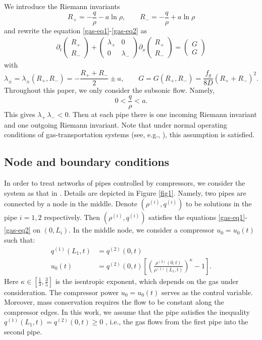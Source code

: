 \documentclass[12pt]{article}
\numberwithin{equation}{section}
\begin{document}
We introduce the Riemann invariants
$$
R_+=-\frac{q}{\rho}-a\ln \rho,\qquad 
R_-=-\frac{q}{\rho}+a\ln \rho
$$
and rewrite the equation \eqref{gas-eq1}-\eqref{gas-eq2} as
\begin{align}\label{gas-RI-eq1}
\partial_t
\begin{pmatrix}
R_+\\[1mm]
R_-
\end{pmatrix}
+
\begin{pmatrix}
\lambda_+ &  0\\[1mm]
 0 & \lambda_-
\end{pmatrix}
\partial_x\begin{pmatrix}
R_+\\[1mm]
R_-
\end{pmatrix}=
\begin{pmatrix}
G\\[1mm]
G
\end{pmatrix}
\end{align}
with 
$$
\lambda_\pm =\lambda_\pm(R_+,R_-)= -\frac{R_++R_-}{2}\pm a,\qquad 
G=G(R_+,R_-) = \frac{f_g}{8D}(R_++R_-)^2.
$$
Throughout this paper, we
only consider the subsonic flow. Namely,
\begin{equation}\label{subsonic}
0<\frac{
q}{\rho}<a.
\end{equation}
This gives $\lambda_+ \, \lambda_- < 0$.
Then at each pipe there is one incoming
Riemann invariant and one outgoing Riemann invariant. Note that under normal operating conditions of gas-transportation systems (see, e.g., \cite{KochEtAl2015, GugatEtAl2015, Gas-Modell:DomschkeHillerLangTischendorf2017, UlkeEtAl2025}), this assumption is satisfied.




\subsection{Node and boundary conditions}


In order to treat networks of pipes controlled by compressors, we consider the system as that in \cite{MR2775185}. Details are depicted in  Figure \ref{fig1}. Namely, two pipes are connected by a node in the middle. Denote $(\rho^{(i)},q^{(i)})$ to be solutions in the pipe $i=1,2$ respectively. Then $(\rho^{(i)},q^{(i)})$ satisfies the equations \eqref{gas-eq1}-\eqref{gas-eq2} on $(0,L_i)$.
In the middle node, we consider a compressor $u_0=u_0(t)$ such that:
\begin{align}
    q^{(1)}(L_1,t)&=q^{(2)}(0,t) \label{couplingMass} \\[1mm]
    u_0(t)&=q^{(2)}(0,t)\left[\left(\frac{\rho^{(2)}(0,t)}{\rho^{(1)}(L_1,t)} \right)^\kappa -1\right]. \label{couplingCompressor}
\end{align}
Here $\kappa\in[\frac{1}{3}, \frac{3}{5}]$ is the isentropic exponent, which depends on the gas under consideration. The compressor power $u_0=u_0(t)$ serves as the control variable. Moreover, mass conservation requires the flow to be constant along the compressor edges. In this work, we assume that the pipe satisfies the inequality $q^{(1)}(L_1,t)=q^{(2)}(0,t) \geq 0$ , i.e., the gas flows from
the first pipe into the second pipe.
\end{document}

